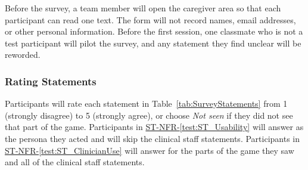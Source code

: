 \documentclass[10pt,titlepage]{article}
\newcommand{\testref}[1]{\hyperref[test:#1]{ST-NFR-\ref*{test:#1}}}
\begin{document}
Before the survey, a team member will open the caregiver area so that each
participant can read one text. The form will not record names, email addresses,
or other personal information. Before the first session, one classmate who is
not a test participant will pilot the survey, and any statement they find
unclear will be reworded.

\subsubsection*{Rating Statements}

Participants will rate each statement in Table~\ref{tab:SurveyStatements} from 1
(strongly disagree) to 5 (strongly agree), or choose \textit{Not seen} if they
did not see that part of the game. Participants in \testref{ST_Usability} will
answer as the persona they acted and will skip the clinical staff statements.
Participants in \testref{ST_ClinicianUse} will answer for the parts of the game
they saw and all of the clinical staff statements.
\end{document}
